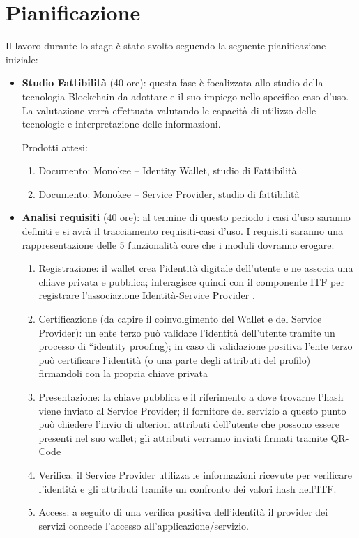 \section{Pianificazione}
Il lavoro durante lo stage è stato svolto seguendo la seguente pianificazione iniziale:
\begin{itemize}
    

\item \textbf{Studio Fattibilità} (40 ore): questa fase è focalizzata allo studio della tecnologia Blockchain da adottare e il suo impiego nello specifico caso d’uso.  La valutazione verrà effettuata valutando le capacità di utilizzo delle tecnologie e interpretazione delle informazioni.

    Prodotti attesi: 
    \begin{enumerate}
        \item Documento: Monokee – Identity Wallet, studio di Fattibilità
        \item Documento: Monokee – Service Provider, studio di fattibilità
    \end{enumerate}
        

\item \textbf{Analisi requisiti} (40 ore): al termine di questo periodo i casi d'uso saranno definiti e si avrà il tracciamento requisiti-casi d'uso.
    I requisiti saranno una rappresentazione delle 5 funzionalità core che i moduli dovranno erogare:
    \begin{enumerate}
        \item Registrazione: il wallet crea l’identità digitale dell’utente e ne associa una chiave privata e pubblica; interagisce quindi con il componente ITF per registrare l’associazione Identità-Service Provider . 
        \item Certificazione (da capire il coinvolgimento del Wallet e del Service Provider): un ente terzo può validare l’identità dell’utente tramite un processo di “identity proofing);  in caso di validazione positiva l’ente terzo può certificare l’identità (o una parte degli attributi del profilo) firmandoli con la propria chiave privata
        \item Presentazione: la chiave pubblica e il riferimento a dove trovarne l’hash viene inviato al Service Provider; il fornitore del servizio a questo punto può chiedere l’invio di ulteriori attributi dell’utente che possono essere presenti nel suo wallet; gli attributi verranno inviati firmati tramite QR-Code
        \item Verifica: il Service Provider utilizza le informazioni ricevute per verificare l’identità e gli attributi tramite un confronto dei valori hash nell’ITF.
        \item Access: a seguito di una verifica positiva dell’identità il provider dei servizi concede l’accesso all’applicazione/servizio.
    \end{enumerate}
    

\end{itemize}
